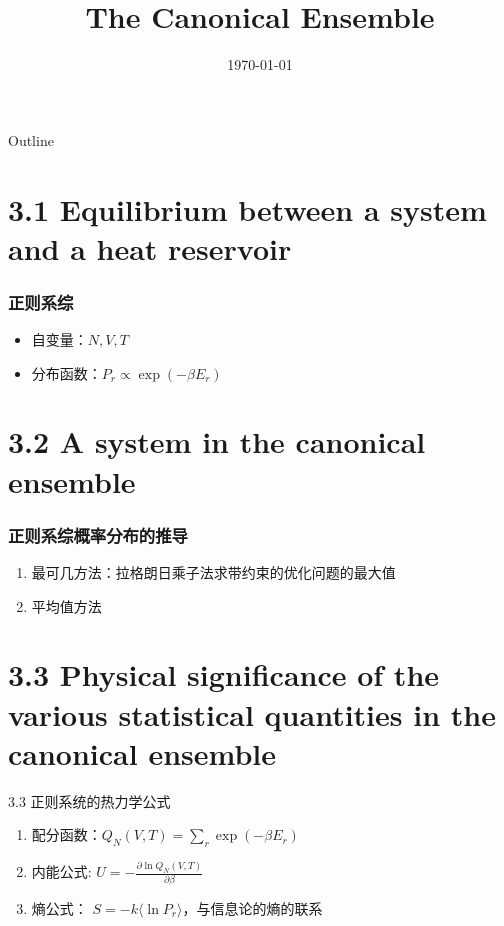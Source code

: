 \documentclass{ctexbeamer}
\title{The Canonical Ensemble}
\date{\today}
\begin{document}
\begin{frame}
	\titlepage
\end{frame}
\begin{frame}{Outline}
    \tableofcontents
\end{frame}
\section{3.1 Equilibrium between 
a system and a heat reservoir
}

\begin{frame}
\frametitle{正则系综}
\begin{itemize}
    \item 自变量：$N,V,T$
    \item 分布函数：$P_r \propto \exp(-\beta E_r)$
\end{itemize}

\end{frame}
\section{3.2 A system in the canonical ensemble
}
\begin{frame}
    \frametitle{正则系综概率分布的推导}
    \begin{enumerate}
        \item 最可几方法：拉格朗日乘子法求带约束的优化问题的最大值
        \item 平均值方法
    \end{enumerate}
    
    \end{frame}
\section{3.3 Physical significance of the various statistical quantities in
the canonical ensemble}
\begin{frame}{3.3 正则系统的热力学公式}
    \begin{enumerate}
        \item 配分函数：$Q_N(V,T) = \sum_{r} \exp(- \beta E_r)$
        \item 内能公式: $U=-\frac{\partial \ln Q_N(V,T)}{\partial \beta}$
        \item 熵公式： $S=-k\langle \ln P_r \rangle$，与信息论的熵的联系
    \end{enumerate}
\end{frame}
\end{document}
